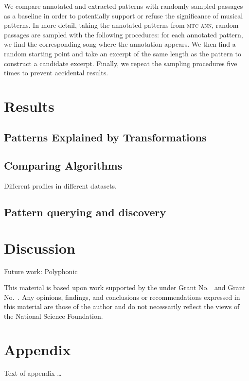 \documentclass[acmsmall,review,anonymous]{acmart}\settopmatter{printfolios=true,printccs=false,printacmref=false}
\begin{document}
We compare annotated and extracted patterns with randomly sampled passages as a baseline in order to potentially support or refuse the significance of musical patterns. In more detail, taking the annotated patterns from \textsc{mtc-ann}, random passages are sampled with the following procedures: for each annotated pattern, we find the corresponding song where the annotation appears. We then find a random starting point and take an excerpt of the same length as the pattern to construct a candidate excerpt. Finally, we repeat the sampling procedures five times to prevent accidental results.


\section{Results}

\subsection{Patterns Explained by Transformations}

\subsection{Comparing Algorithms}
Different profiles in different datasets.

\subsection{Pattern querying and discovery}

\section{Discussion}

Future work: Polyphonic


\begin{acks}                            %
  This material is based upon work supported by the
   under Grant
  No.~ and Grant
  No.~.  Any opinions, findings, and
  conclusions or recommendations expressed in this material are those
  of the author and do not necessarily reflect the views of the
  National Science Foundation.
\end{acks}


%


\appendix
\section{Appendix}

Text of appendix \ldots
\end{document}

